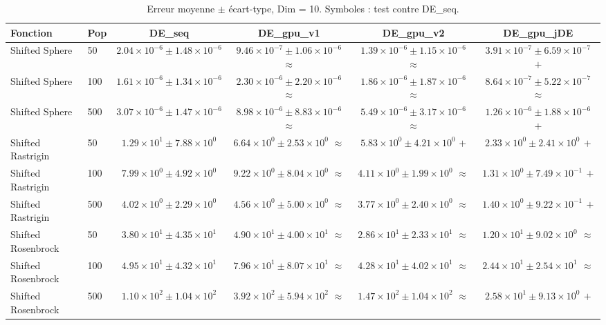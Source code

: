 \begin{table}[t]
\centering
\caption{Erreur moyenne $\pm$ écart-type, Dim = 10. Symboles : test contre DE\_seq.}
\label{tab:quality_d10}
\scriptsize
\begin{tabular}{llcccc}
\toprule
Fonction & Pop & DE\_seq & DE\_gpu\_v1 & DE\_gpu\_v2 & DE\_gpu\_jDE \\
\midrule
Shifted Sphere & 50 & $2.04\times10^{-6}\pm1.48\times10^{-6}$ & $9.46\times10^{-7}\pm1.06\times10^{-6}$ $\approx$ & $1.39\times10^{-6}\pm1.15\times10^{-6}$ $\approx$ & \textbf{$3.91\times10^{-7}\pm6.59\times10^{-7}$ $+$} \\
Shifted Sphere & 100 & $1.61\times10^{-6}\pm1.34\times10^{-6}$ & $2.30\times10^{-6}\pm2.20\times10^{-6}$ $\approx$ & $1.86\times10^{-6}\pm1.87\times10^{-6}$ $\approx$ & \textbf{$8.64\times10^{-7}\pm5.22\times10^{-7}$ $\approx$} \\
Shifted Sphere & 500 & $3.07\times10^{-6}\pm1.47\times10^{-6}$ & $8.98\times10^{-6}\pm8.83\times10^{-6}$ $\approx$ & $5.49\times10^{-6}\pm3.17\times10^{-6}$ $\approx$ & \textbf{$1.26\times10^{-6}\pm1.88\times10^{-6}$ $+$} \\
Shifted Rastrigin & 50 & $1.29\times10^{1}\pm7.88\times10^{0}$ & $6.64\times10^{0}\pm2.53\times10^{0}$ $\approx$ & $5.83\times10^{0}\pm4.21\times10^{0}$ $+$ & \textbf{$2.33\times10^{0}\pm2.41\times10^{0}$ $+$} \\
Shifted Rastrigin & 100 & $7.99\times10^{0}\pm4.92\times10^{0}$ & $9.22\times10^{0}\pm8.04\times10^{0}$ $\approx$ & $4.11\times10^{0}\pm1.99\times10^{0}$ $\approx$ & \textbf{$1.31\times10^{0}\pm7.49\times10^{-1}$ $+$} \\
Shifted Rastrigin & 500 & $4.02\times10^{0}\pm2.29\times10^{0}$ & $4.56\times10^{0}\pm5.00\times10^{0}$ $\approx$ & $3.77\times10^{0}\pm2.40\times10^{0}$ $\approx$ & \textbf{$1.40\times10^{0}\pm9.22\times10^{-1}$ $+$} \\
Shifted Rosenbrock & 50 & $3.80\times10^{1}\pm4.35\times10^{1}$ & $4.90\times10^{1}\pm4.00\times10^{1}$ $\approx$ & $2.86\times10^{1}\pm2.33\times10^{1}$ $\approx$ & \textbf{$1.20\times10^{1}\pm9.02\times10^{0}$ $\approx$} \\
Shifted Rosenbrock & 100 & $4.95\times10^{1}\pm4.32\times10^{1}$ & $7.96\times10^{1}\pm8.07\times10^{1}$ $\approx$ & $4.28\times10^{1}\pm4.02\times10^{1}$ $\approx$ & \textbf{$2.44\times10^{1}\pm2.54\times10^{1}$ $\approx$} \\
Shifted Rosenbrock & 500 & $1.10\times10^{2}\pm1.04\times10^{2}$ & $3.92\times10^{2}\pm5.94\times10^{2}$ $\approx$ & $1.47\times10^{2}\pm1.04\times10^{2}$ $\approx$ & \textbf{$2.58\times10^{1}\pm9.13\times10^{0}$ $+$} \\

\end{tabular}
\end{table}

